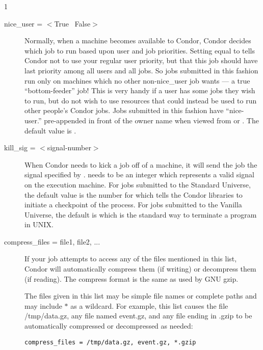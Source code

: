 \begin{ManPage}{\label{man-condor-submit}}{1}
\begin{description}
\item[nice\_user = $<$True \Bar\ False$>$] \label{man-condor-submit-nice}Normally, when a machine
becomes available to Condor, Condor decides which job to run based upon
user and job priorities. Setting  equal to 
tells Condor not to use your regular user priority, but that this job
should have last priority among all users and all jobs. So jobs
submitted in this fashion run only on machines which no other
non-nice\_user job wants --- a true ``bottom-feeder'' job! This is very
handy if a user has some jobs they wish to run, but do not wish to use
resources that could instead be used to run other people's Condor jobs. Jobs
submitted in this fashion have ``nice-user.'' pre-appended in front of
the owner name when viewed from  or .  The
default value is .


\item[kill\_sig = $<$signal-number$>$] When Condor needs to kick a job
off of a machine, it will send the job the signal specified by
.   needs to be an integer which
represents a valid signal on the execution machine.  For jobs submitted
to the Standard Universe, the default value is the number for
\verb@SIGTSTP@ which tells the Condor libraries to initiate a checkpoint
of the process.  For jobs submitted to the Vanilla Universe, the default 
is \verb@SIGTERM@ which is the standard way to terminate a program in UNIX.  


\item[compress\_files = file1, file2, ...]

If your job attempts to access any of the files mentioned in this list,
Condor will automatically compress them (if writing) or decompress them (if reading).
The compress format is the same as used by GNU gzip.

The files given in this list may be simple file names or complete paths and may
include $*$ as a wildcard.  For example, this list causes the file /tmp/data.gz,
any file named event.gz, and any file ending in .gzip to be automatically
compressed or decompressed as needed:

\begin{verbatim}
compress_files = /tmp/data.gz, event.gz, *.gzip
\end{verbatim}


\end{description}
\end{ManPage}
